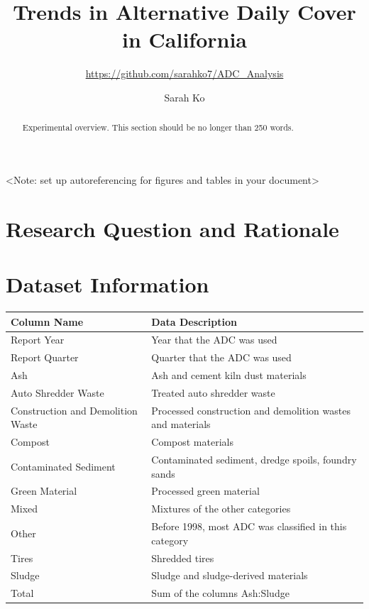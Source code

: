 \documentclass[12pt,]{article}
\title{Trends in Alternative Daily Cover in California}
\subtitle{\url{https://github.com/sarahko7/ADC_Analysis}}
\author{Sarah Ko}
\date{}
\begin{document}
\maketitle
\begin{abstract}
Experimental overview. This section should be no longer than 250 words.
\end{abstract}

\newpage

\tableofcontents 

\newpage

\listoftables 

\newpage

\listoffigures 

\newpage

\textless{}Note: set up autoreferencing for figures and tables in your
document\textgreater{}

\section{Research Question and
Rationale}\label{research-question-and-rationale}

\newpage

\section{Dataset Information}\label{dataset-information}

\begin{table}[H]
\centering
\begin{tabular}{l|l}
\hline
\textbf{Column Name} & \textbf{Data Description}\\
\hline
Report Year & Year that the ADC was used\\
\hline
Report Quarter & Quarter that the ADC was used\\
\hline
Ash & Ash and cement kiln dust materials\\
\hline
Auto Shredder Waste & Treated auto shredder waste\\
\hline
Construction and Demolition Waste & Processed construction and demolition wastes and materials\\
\hline
Compost & Compost materials\\
\hline
Contaminated Sediment & Contaminated sediment, dredge spoils, foundry sands\\
\hline
Green Material & Processed green material\\
\hline
Mixed & Mixtures of the other categories\\
\hline
Other & Before 1998, most ADC was classified in this category\\
\hline
Tires & Shredded tires\\
\hline
Sludge & Sludge and sludge-derived materials\\
\hline
Total & Sum of the columns Ash:Sludge\\
\hline
\end{tabular}
\end{table}
\end{document}
